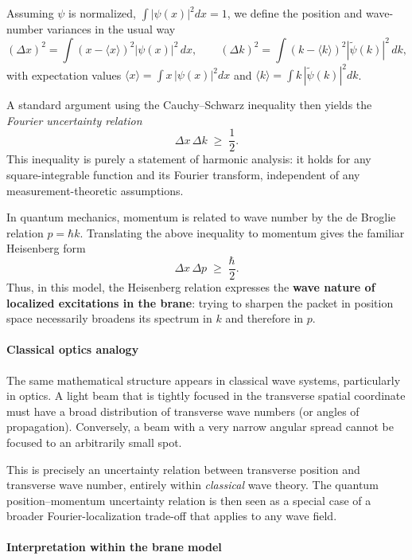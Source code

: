 Assuming $\psi$ is normalized, $\int |\psi(x)|^2 dx = 1$, we define the
position and wave-number variances in the usual way
\[
(\Delta x)^2 = \int (x-\langle x\rangle)^2 |\psi(x)|^2\,dx, \qquad
(\Delta k)^2 = \int (k-\langle k\rangle)^2 |\tilde{\psi}(k)|^2\,dk,
\]
with expectation values
$\langle x\rangle = \int x\,|\psi(x)|^2 dx$ and
$\langle k\rangle = \int k\,|\tilde{\psi}(k)|^2 dk$.

A standard argument using the Cauchy–Schwarz inequality then yields the
\emph{Fourier uncertainty relation}
\[
\Delta x\,\Delta k \;\geq\; \frac{1}{2}.
\]
This inequality is purely a statement of harmonic analysis: it holds for
any square-integrable function and its Fourier transform, independent of
any measurement-theoretic assumptions.\cite{FollandUncertaintyPrinciple,FollandSitaram1997}

In quantum mechanics, momentum is related to wave number by the de
Broglie relation $p = \hbar k$. Translating the above inequality to
momentum gives the familiar Heisenberg form
\[
\Delta x\,\Delta p \;\geq\; \frac{\hbar}{2}.
\]
Thus, in this model, the Heisenberg relation expresses the \textbf{wave
nature of localized excitations in the brane}: trying to sharpen the
packet in position space necessarily broadens its spectrum in $k$ and
therefore in $p$.

\paragraph{Classical optics analogy}\label{classical-optics-analogy}

The same mathematical structure appears in classical wave systems,
particularly in optics. A light beam that is tightly focused in the
transverse spatial coordinate must have a broad distribution of
transverse wave numbers (or angles of propagation). Conversely, a beam
with a very narrow angular spread cannot be focused to an arbitrarily
small spot.\cite{FollandSitaram1997,UncertaintyClassicalOptics}

This is precisely an uncertainty relation between transverse position
and transverse wave number, entirely within \emph{classical} wave
theory. The quantum position–momentum uncertainty relation is then seen
as a special case of a broader Fourier-localization trade-off that
applies to any wave field.

\paragraph{Interpretation within the brane
model}\label{uncertainty-interpretation-brane}

